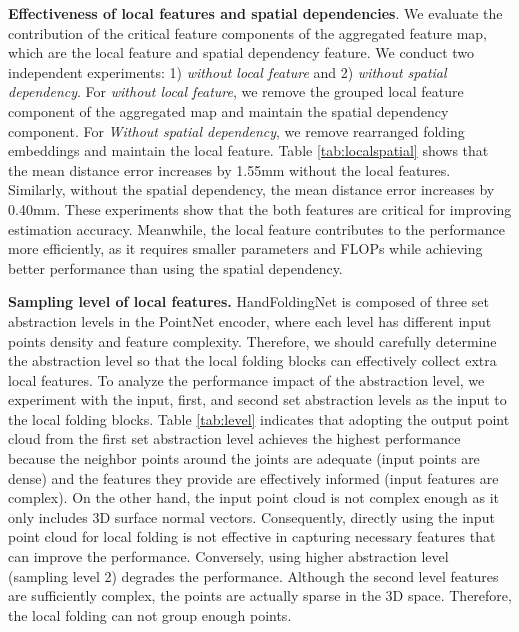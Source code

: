 \documentclass[10pt,twocolumn,letterpaper]{article}
\begin{document}
\noindent
\textbf{Effectiveness of local features and spatial dependencies}.
We evaluate the contribution of the critical feature components of the aggregated feature map, which are the local feature and spatial dependency feature. We conduct two independent experiments: 1) \textit{without local feature} and 2) \textit{without spatial dependency}. For \textit{without local feature}, we remove the grouped local feature component of the aggregated map and maintain the spatial dependency component. For \textit{Without spatial dependency}, we remove rearranged folding embeddings and maintain the local feature. Table \ref{tab:localspatial} shows that the mean distance error increases by 1.55mm without the local features. Similarly, without the spatial dependency, the mean distance error increases by 0.40mm. These experiments show that the both features are critical for improving estimation accuracy. Meanwhile, the local feature contributes to the performance more efficiently, as it requires smaller parameters and FLOPs while achieving better performance than using the spatial dependency.



\noindent
\textbf{Sampling level of local features.}
HandFoldingNet is composed of three set abstraction levels in the PointNet encoder, where each level has different input points density and feature complexity. Therefore, we should carefully determine the abstraction level so that the local folding blocks can effectively collect extra local features.
To analyze the performance impact of the abstraction level, we experiment with the input, first, and second set abstraction levels as the input to the local folding blocks. Table \ref{tab:level} indicates that adopting the output point cloud from the first set abstraction level achieves the highest performance because the neighbor points around the joints are adequate (input points are dense) and the features they provide are effectively informed (input features are complex). On the other hand, the input point cloud is not complex enough as it only includes 3D surface normal vectors.
Consequently, directly using the input point cloud for local folding is not effective in capturing necessary features that can improve the performance. 
Conversely, using higher abstraction level (sampling level 2) degrades the performance. Although the second level features are sufficiently complex, the points are actually sparse in the 3D space. Therefore, the local folding can not group enough points.
\end{document}
